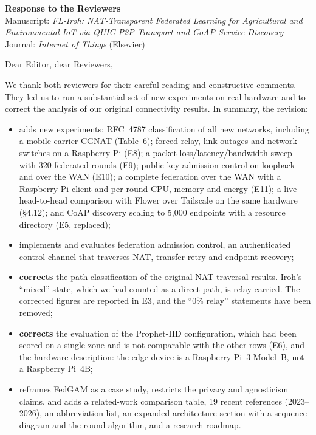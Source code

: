 \documentclass[11pt,a4paper]{article}
\begin{document}
\begin{center}
{\Large\bfseries Response to the Reviewers}\\[0.4em]
Manuscript: \emph{FL-Iroh: NAT-Transparent Federated Learning for Agricultural and Environmental IoT via QUIC P2P Transport and CoAP Service Discovery}\\
Journal: \emph{Internet of Things} (Elsevier)
\end{center}

Dear Editor, dear Reviewers,

We thank both reviewers for their careful reading and constructive comments. They led us to run a substantial set of new experiments on real hardware and to correct the analysis of our original connectivity results. In summary, the revision:

\begin{itemize}[leftmargin=1.3em,itemsep=0.15em]
\item adds new experiments: RFC~4787 classification of all new networks, including a mobile-carrier CGNAT (Table~6); forced relay, link outages and network switches on a Raspberry Pi (E8); a packet-loss/latency/bandwidth sweep with 320 federated rounds (E9); public-key admission control on loopback and over the WAN (E10); a complete federation over the WAN with a Raspberry Pi client and per-round CPU, memory and energy (E11); a live head-to-head comparison with Flower over Tailscale on the same hardware (\S4.12); and CoAP discovery scaling to 5{,}000 endpoints with a resource directory (E5, replaced);
\item implements and evaluates federation admission control, an authenticated control channel that traverses NAT, transfer retry and endpoint recovery;
\item \textbf{corrects} the path classification of the original NAT-traversal results. Iroh's ``mixed'' state, which we had counted as a direct path, is relay-carried. The corrected figures are reported in E3, and the ``0\% relay'' statements have been removed;
\item \textbf{corrects} the evaluation of the Prophet-IID configuration, which had been scored on a single zone and is not comparable with the other rows (E6), and the hardware description: the edge device is a Raspberry Pi~3 Model~B, not a Raspberry Pi~4B;
\item reframes FedGAM as a case study, restricts the privacy and agnosticism claims, and adds a related-work comparison table, 19 recent references (2023--2026), an abbreviation list, an expanded architecture section with a sequence diagram and the round algorithm, and a research roadmap.
\end{itemize}
\end{document}

